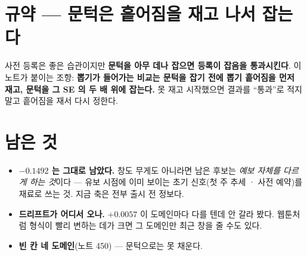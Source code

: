 \documentclass[11pt]{article}
\begin{document}
\section*{규약 --- 문턱은 흩어짐을 재고 나서 잡는다}

사전 등록은 좋은 습관이지만 \textbf{문턱을 아무 데나 잡으면 등록이
잡음을 통과시킨다}. 이 노트가 붙이는 조항: \textbf{뽑기가 들어가는
비교는 문턱을 잡기 전에 뽑기 흩어짐을 먼저 재고, 문턱을 그 SE 의 두 배
위에 잡는다.} 못 재고 시작했으면 결과를 ``통과''로 적지 말고 흩어짐을
재서 다시 정한다.

\section*{남은 것}

\begin{itemize}
\item \textbf{$-0.1492$ 는 그대로 남았다.} 창도 무게도 아니라면 남은
후보는 \emph{예보 자체를 다르게 하는 것}이다 --- 유보 시점에 이미 보이는
초기 신호(첫 주 추세 · 사전 예약)를 재료로 쓰는 것. 지금 축은 전부
출시 전 정보다.
\item \textbf{드리프트가 어디서 오나.} $+0.0057$ 이 도메인마다 다를 텐데
안 갈라 봤다. 웹툰처럼 형식이 빨리 변하는 데가 크면 그 도메인만
최근 창을 줄 수도 있다.
\item \textbf{빈 칸 네 도메인}(노트 450) --- 문턱으로는 못 채운다.
\end{itemize}
\end{document}
